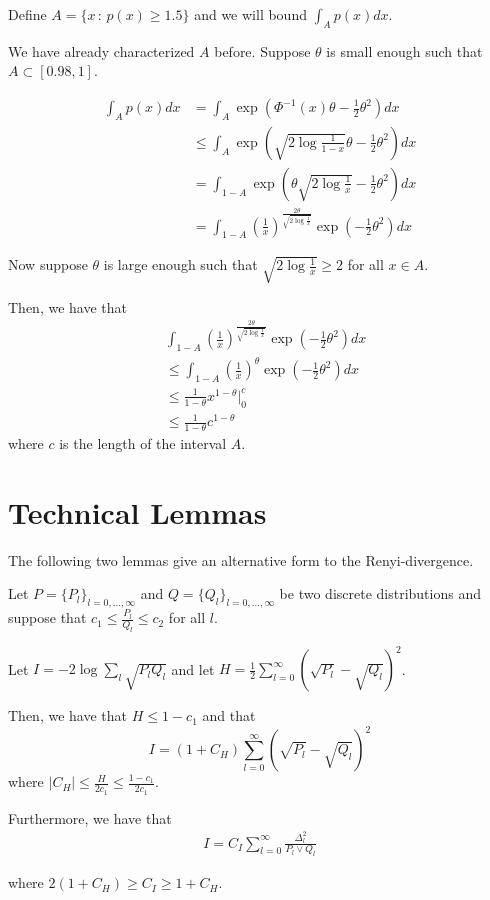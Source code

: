 \documentclass{article}
\begin{document}
Define $A = \{ x \,:\, p(x) \geq 1.5\}$ and we will bound $\int_A p(x) dx$. 

We have already characterized $A$ before. Suppose $\theta$ is small enough such that $A \subset [0.98, 1]$. 

\begin{align*}
\int_A p(x) dx &= \int_A \exp( \Phi^{-1}(x) \theta - \frac{1}{2}\theta^2 ) dx \\ 
   &\leq \int_A \exp \left( \sqrt{2 \log \frac{1}{1-x}} \theta - \frac{1}{2} \theta^2 \right) dx \\
   &= \int_{1-A} \exp\left( \theta \sqrt{2 \log \frac{1}{x} } - \frac{1}{2} \theta^2 \right) dx \\
   &= \int_{1-A} \left(\frac{1}{x}\right)^{\frac{2\theta}{\sqrt{2 \log \frac{1}{x}}}} \exp(-\frac{1}{2} \theta^2) dx
\end{align*}

Now suppose $\theta$ is large enough such that $\sqrt{2 \log \frac{1}{x}} \geq 2$ for all $x \in A$. 

Then, we have that
\begin{align*}
 & \int_{1-A} \left(\frac{1}{x}\right)^{\frac{2\theta}{\sqrt{2 \log \frac{1}{x}}}} \exp(-\frac{1}{2} \theta^2) dx \\
&\leq \int_{1-A} \left( \frac{1}{x} \right)^{\theta} \exp(-\frac{1}{2}\theta^2) dx \\
&\leq \frac{1}{1 - \theta} x^{1-\theta} \Big|^{c}_0 \\
&\leq \frac{1}{1-\theta} c^{1-\theta} 
\end{align*}
where $c$ is the length of the interval $A$. 

\newpage
\section{Technical Lemmas}

The following two lemmas give an alternative form to the Renyi-divergence. 

\begin{lemma}
\label{lem:simplify_renyi2}
Let $P = \{ P_l \}_{l = 0,..., \infty}$ and $Q = \{ Q_l \}_{l=0,...,\infty}$ be two discrete distributions and suppose that $c_1 \leq \frac{P_l}{Q_l} \leq c_2$ for all $l$. 

Let $I = - 2 \log \sum_l \sqrt{ P_l Q_l}$ and let $H = \frac{1}{2} \sum_{l=0}^\infty (\sqrt{P_l} - \sqrt{Q_l})^2$. 

Then, we have that $H \leq 1 - c_1$ and that
\[
I = (1 + C_H) \sum_{l = 0}^\infty (\sqrt{P_l} - \sqrt{Q_l})^2 
\]
where $| C_H | \leq \frac{H}{2 c_1} \leq \frac{1-c_1}{2c_1}$. 

Furthermore, we have that
\begin{align*}
I = C_I \sum_{l=0}^\infty \frac{\Delta_l^2}{P_l \vee Q_l} 
\end{align*}

where $2(1 + C_H)  \geq C_I \geq  1 + C_H$.
\end{lemma}
\end{document}
